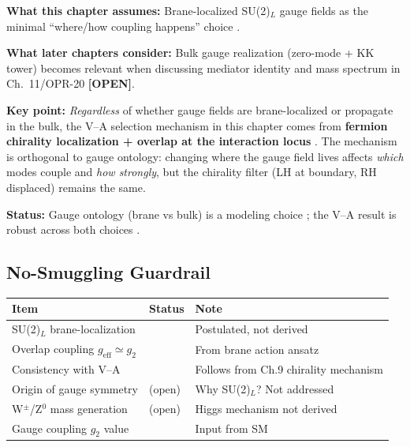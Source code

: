 \begin{tcolorbox}[colback=yellow!5!white, colframe=yellow!60!black,
    title=\textbf{Model Choice: Brane Gauge vs Bulk Gauge}]
\textbf{What this chapter assumes:} Brane-localized SU(2)$_L$ gauge fields
as the minimal ``where/how coupling happens'' choice \tagP{}.

\textbf{What later chapters consider:} Bulk gauge realization (zero-mode + KK
tower) becomes relevant when discussing mediator identity and mass spectrum
in Ch.~11/OPR-20 \textbf{[OPEN]}.

\textbf{Key point:} \emph{Regardless} of whether gauge fields are brane-localized
or propagate in the bulk, the V--A selection mechanism in this chapter comes
from \textbf{fermion chirality localization + overlap at the interaction locus}
\tagDc{}. The mechanism is orthogonal to gauge ontology: changing where the
gauge field lives affects \emph{which} modes couple and \emph{how strongly},
but the chirality filter (LH at boundary, RH displaced) remains the same.

\textbf{Status:} Gauge ontology (brane vs bulk) is a modeling choice \tagP{};
the V--A result is robust across both choices \tagDc{}.
\end{tcolorbox}

\subsection{No-Smuggling Guardrail}

\begin{tcolorbox}[colback=red!5!white, colframe=red!50!black, title=Epistemic Status: SU(2)$_L$ Embedding]
\small
\begin{tabular}{lll}
\toprule
\textbf{Item} & \textbf{Status} & \textbf{Note} \\
\midrule
SU(2)$_L$ brane-localization & \tagP{} & Postulated, not derived \\
Overlap coupling $g_{\text{eff}} \simeq g_2$ & \tagP{} & From brane action ansatz \\
Consistency with V--A & \tagDc{} & Follows from Ch.9 chirality mechanism \\
Origin of gauge symmetry & (open) & Why SU(2)$_L$? Not addressed \\
W$^\pm$/Z$^0$ mass generation & (open) & Higgs mechanism not derived \\
Gauge coupling $g_2$ value & \tagBL{} & Input from SM \\
\bottomrule
\end{tabular}
\end{tcolorbox}

